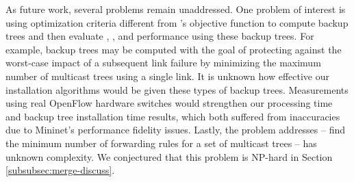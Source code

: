 As future work, several problems remain unaddressed. One problem of interest is using optimization criteria different from \mcs's objective function to compute backup trees and then evaluate
\pres, \posts, and \merge performance using these backup trees.  For example, backup trees may be computed with the goal of protecting against the worst-case impact of a subsequent link failure
by minimizing the maximum number of multicast trees using a single link. %
It is unknown how effective our installation algorithms would be given these types of backup trees. %
Measurements using real OpenFlow hardware switches would strengthen our \pcnt processing time and backup tree installation time results, which both suffered from inaccuracies due to Mininet's
performance fidelity issues.  
Lastly, the problem \merge addresses -- find the minimum number of forwarding rules for a set of multicast trees -- has unknown complexity.
We conjectured that this problem is NP-hard in Section \ref{subsubsec:merge-discuss}.





